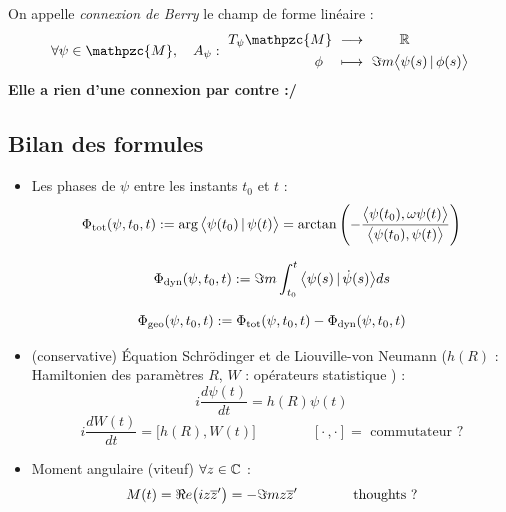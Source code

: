 \begin{definition}\label{def:berry_connx}
	On appelle \emph{connexion de Berry} le champ de forme linéaire :
	\begin{equation}\label{eq:berry_connx}
		\forall \psi\in\mathpzc{M},\quad A_\psi :\ \begin{aligned} T_\psi\mathpzc{M}\ &\lr\qquad\ \R \\ \phi\quad &\longmapsto\ \Im m \big\langle \psi(s) \, |\, \phi(s) \big\rangle
		\end{aligned}
	\end{equation}
	\textbf{Elle a rien d'une connexion par contre :/}
\end{definition}

\subsection{Bilan des formules}

\begin{itemize}
	\item Les phases de $\psi$ entre les instants $t_0$ et $t$ :
	\begin{equation}\label{eq:phase_tot}
		\Phi_{\text{tot}}(\psi, t_0, t) := \arg\big\langle\psi(t_0) \,|\, \psi(t)\big\rangle = \arctan \left( -\frac{\big\langle\psi(t_0), \omega\psi(t)\big\rangle}{\big\langle\psi(t_0), \psi(t)\big\rangle} \right)
	\end{equation}
	
	\begin{equation}\label{eq:phase_dyn}
		\Phi_{\text{dyn}}(\psi,t_0,t) := \Im m \int_{t_0}^t\big\langle \psi(s) \,|\, \dot{\psi}(s) \big\rangle ds
	\end{equation}
	
	\begin{equation}\label{eq:phase_geo}
		\Phi_{\text{geo}}(\psi, t_0, t) := \Phi_{\text{tot}}(\psi, t_0, t) - \Phi_{\text{dyn}}(\psi,t_0,t)
	\end{equation}
	
	\item (conservative) Équation Schrödinger et de Liouville-von Neumann ($h(R)$ : Hamiltonien des paramètres $R$, $W$ : opérateurs statistique ) \cite[p.6]{bohm_geometric_2003} :
	\begin{equation}\label{eq:schrodinger}
		i\frac{d \psi(t)}{dt} = h(R)\psi(t)
	\end{equation}
	\begin{equation}\label{eq:liouville-neumann}
		i\frac{d W(t)}{dt} = \big[h(R),W(t)\big] \qquad\qquad [\cdot\,,\cdot]=\text{ commutateur ?}
	\end{equation}
	
	\item Moment angulaire (viteuf) $\forall z\in\mathbb{C}$ :
	\begin{equation}\label{eq:mom_angu}
		M(t) = \Re e \big(iz\overline{z}'\big) = -\Im m z\overline{z}'  \qquad\qquad \text{thoughts ?}
	\end{equation}
	
\end{itemize}


